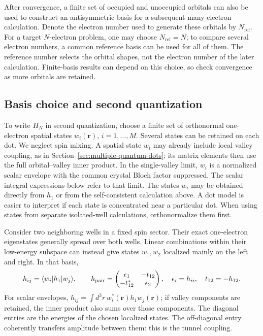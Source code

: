 After convergence, a finite set of occupied and unoccupied
orbitals can also be used to construct an antisymmetric basis
for a subsequent many-electron calculation. Denote the
electron number used to generate these orbitals by $N_{\mathrm{ref}}$.
For a target $N$-electron problem, one may choose
$N_{\mathrm{ref}}=N$; to compare several electron numbers, a common
reference basis can be used for all of them. The reference number
selects the orbital shapes, not the electron number of the later
calculation. Finite-basis results can depend on this choice, so
check convergence as more orbitals are retained.


\subsection{Basis choice and second quantization}
\label{sec:device-orbital-basis}

To write $H_N$ in second quantization, choose a finite set of
orthonormal one-electron spatial states $w_i(\mathbf r)$,
$i=1,\ldots,M$. Several states can be retained on each dot.
We neglect spin mixing. A spatial state $w_i$ may already include
local valley coupling, as in Section~\ref{sec:multiple-quantum-dots};
its matrix elements then use the full orbital--valley inner product.
In the single-valley limit, $w_i$ is a normalized scalar envelope
with the common crystal Bloch factor suppressed. The scalar integral
expressions below refer to that limit.
The states $w_i$ may be obtained directly from $h_1$ or from
the self-consistent calculation above. A dot model is easier to
interpret if each state is concentrated near a particular dot.
When using states from separate isolated-well calculations,
orthonormalize them first.

Consider two neighboring wells in a fixed spin sector. Their exact one-electron
eigenstates generally spread over both wells. Linear combinations
within their low-energy subspace can instead give states $w_1,w_2$
localized mainly on the left and right. In that basis,
\begin{equation}
 h_{ij}=\bra{w_i}h_1\ket{w_j},
 \qquad
 h_{\mathrm{pair}}=
 \begin{pmatrix}
  \epsilon_1&-t_{12}\\
  -t_{12}^*&\epsilon_2
 \end{pmatrix},
 \quad
 \epsilon_i=h_{ii},\quad t_{12}=-h_{12}.
 \label{eq:device-one-body-matrix}
\end{equation}
For scalar envelopes,
$h_{ij}=\int d^3r\,w_i^*(\mathbf r)h_1w_j(\mathbf r)$;
if valley components are retained, the inner product also sums
over those components.
The diagonal entries are the energies of the chosen localized
states. The off-diagonal entry coherently transfers amplitude
between them: this is the tunnel coupling.

